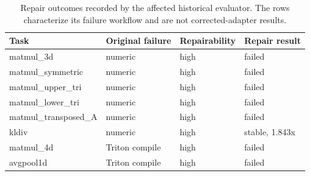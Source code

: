 \begin{table}[htbp]
\centering
\caption{Repair outcomes recorded by the affected historical evaluator. The rows characterize its failure workflow and are not corrected-adapter results.}
\label{tab:repair-subset-appendix}
\scriptsize
\begin{tabularx}{\linewidth}{l l l X}
\toprule
Task & Original failure & Repairability & Repair result \\
\midrule
matmul\_3d & numeric & high & failed \\
matmul\_symmetric & numeric & high & failed \\
matmul\_upper\_tri & numeric & high & failed \\
matmul\_lower\_tri & numeric & high & failed \\
matmul\_transposed\_A & numeric & high & failed \\
kldiv & numeric & high & stable, 1.843x \\
matmul\_4d & Triton compile & high & failed \\
avgpool1d & Triton compile & high & failed \\
\bottomrule
\end{tabularx}
\end{table}
